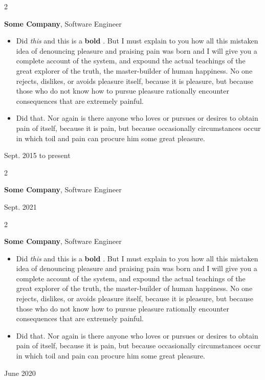 \documentclass[10pt, letterpaper]{article}
\newenvironment{highlights}{
    \begin{itemize}[
        topsep=0.10 cm,
        parsep=0.10 cm,
        partopsep=0pt,
        itemsep=0pt,
        leftmargin=0.4 cm + 10pt
    ]
}{
    \end{itemize}
} %
\newenvironment{twocolentry}[2][]{
    \onecolentry
    \def\secondColumn{#2}
    \setcolumnwidth{\fill, 4.5 cm}
    \begin{paracol}{2}
}{
    \switchcolumn \raggedleft \secondColumn
    \end{paracol}
    \endonecolentry
} %
\let\hrefWithoutArrow\href
\renewcommand{\href}[2]{\hrefWithoutArrow{#1}{\mbox{\ifthenelse{\equal{#2}{}}{ }{#2 }\raisebox{.15ex}{\footnotesize \faExternalLink*}}}}
\begin{document}
        \begin{twocolentry}{
            Sept. 2015 to present
        }
            \textbf{Some \textnormal{Company}}, Software Engineer
            \begin{highlights}
                \item Did \textit{this} and this is a \textbf{bold} \href{https://example.com}{link}. But I must explain to you how all this mistaken idea of denouncing pleasure and praising pain was born and I will give you a complete account of the system, and expound the actual teachings of the great explorer of the truth, the master-builder of human happiness. No one rejects, dislikes, or avoids pleasure itself, because it is pleasure, but because those who do not know how to pursue pleasure rationally encounter consequences that are extremely painful.
                \item Did that. Nor again is there anyone who loves or pursues or desires to obtain pain of itself, because it is pain, but because occasionally circumstances occur in which toil and pain can procure him some great pleasure.
            \end{highlights}
        \end{twocolentry}


        \vspace{0.2 cm}

        \begin{twocolentry}{
            Sept. 2021
        }
            \textbf{Some \textnormal{Company}}, Software Engineer
        \end{twocolentry}


        \vspace{0.2 cm}

        \begin{twocolentry}{
            June 2020
        }
            \textbf{Some \textnormal{Company}}, Software Engineer
            \begin{highlights}
                \item Did \textit{this} and this is a \textbf{bold} \href{https://example.com}{link}. But I must explain to you how all this mistaken idea of denouncing pleasure and praising pain was born and I will give you a complete account of the system, and expound the actual teachings of the great explorer of the truth, the master-builder of human happiness. No one rejects, dislikes, or avoids pleasure itself, because it is pleasure, but because those who do not know how to pursue pleasure rationally encounter consequences that are extremely painful.
                \item Did that. Nor again is there anyone who loves or pursues or desires to obtain pain of itself, because it is pain, but because occasionally circumstances occur in which toil and pain can procure him some great pleasure.
            \end{highlights}
        \end{twocolentry}
\end{document}
